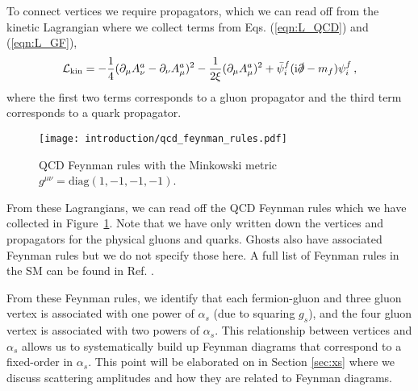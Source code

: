 \documentclass[main.tex]{subfiles}
\begin{document}
    To connect vertices we require propagators, which
    we can read off from the kinetic Lagrangian where
    we collect terms from Eqs. (\ref{eqn:L_QCD}) and (\ref{eqn:L_GF}), 
    \begin{equation}\label{L_kin}
        \mathcal{L}_{\mathrm{kin}} = -\dfrac{1}{4}(\partial_{\mu}A^{a}_{\nu}-\partial_{\nu}A^{a}_{\mu})^{2} - \dfrac{1}{2\xi}(\partial_{\mu}A^{a}_{\mu})^{2} + \bar{\psi}_{i}^{f}(\mathrm{i}\slashed{\partial}-m_{f})\psi_{i}^{f} \, ,
    \end{equation}
    where the first two terms corresponds to a gluon
    propagator and the third term corresponds to
    a quark propagator.

    \begin{figure}
        \texttt{[image: introduction/qcd\_feynman\_rules.pdf]}
        \caption{QCD Feynman rules with the Minkowski metric $g^{\mu\nu} = \mathrm{diag}(1, -1, -1, -1)$.}
        \label{fig:qcd_feynman_rules}
    \end{figure}

    From these Lagrangians, we can read off the QCD Feynman rules
    which we have collected in Figure~\ref{fig:qcd_feynman_rules}.
    Note that we have only written down the vertices and propagators
    for the physical gluons and quarks.
    Ghosts also have associated Feynman rules but we do
    not specify those here. A full list of Feynman rules
    in the SM can be found in Ref. \cite{Romao:2012pq}.

    From these Feynman rules, we identify that each
    fermion-gluon and three gluon vertex
    is associated with one power of $\alpha_{s}$ (due to squaring $g_{s}$),
    and the four gluon vertex is associated with
    two powers of $\alpha_{s}$. This relationship
    between vertices and $\alpha_{s}$ allows
    us to systematically build up Feynman diagrams
    that correspond to a fixed-order in $\alpha_{s}$.
    This point will be elaborated on in Section
    \ref{sec:xs} where we discuss scattering amplitudes
    and how they are related to Feynman diagrams.
\end{document}
